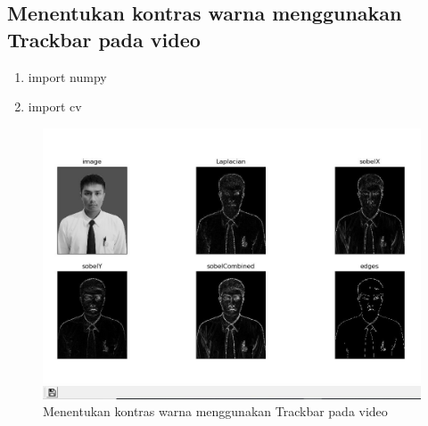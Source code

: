 \newpage
\subsection{Menentukan kontras warna menggunakan Trackbar pada video}

\begin{enumerate}
	\item import numpy
	\item import cv
\end{enumerate}

\newpage
\begin{figure}[ht]
\centering
\includegraphics[scale=0.5]{figures/2,70.jpg}
\caption{Menentukan kontras warna menggunakan Trackbar pada video}
\label{contoh}
\end{figure}